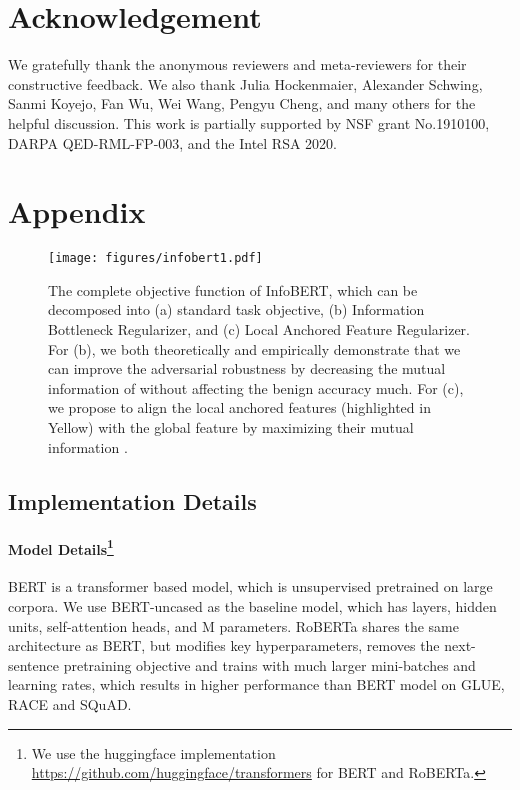 \documentclass{article} \usepackage{iclr2021_conference,times}
\theoremstyle{definition}
\theoremstyle{remark}
\newcommand{\method}{InfoBERT\xspace}
\begin{document}
\section{Acknowledgement}
We gratefully thank the anonymous reviewers and meta-reviewers for their constructive feedback. We also thank Julia Hockenmaier, Alexander Schwing, Sanmi Koyejo, Fan Wu, Wei Wang, Pengyu Cheng, and many others for the helpful discussion.   This work is partially supported by NSF grant No.1910100, DARPA QED-RML-FP-003, and the Intel RSA 2020. 



\newpage
\appendix
\section{Appendix}

\begin{figure}[htp!]
    \centering
    \texttt{[image: figures/infobert1.pdf]}
    \caption{The complete objective function of \method, which can be decomposed into (a) standard task objective, (b) Information Bottleneck Regularizer, and (c) Local Anchored Feature Regularizer. For (b), we both theoretically and empirically demonstrate that we can improve the adversarial robustness by decreasing the mutual information of  without affecting the benign accuracy much. For (c), we propose to align the local anchored features  (highlighted in Yellow) with the global feature  by maximizing their mutual information . }
    \label{fig:overall}
\end{figure}

\subsection{Implementation Details} \label{ap:setup}


\paragraph[Model Details]{Model Details\footnote{We use the huggingface implementation  \url{https://github.com/huggingface/transformers} for BERT and RoBERTa.}}  BERT is a transformer \citep{DBLP:conf/nips/VaswaniSPUJGKP17} based model, which is unsupervised pretrained on large corpora. We use BERT-uncased as the baseline model, which has  layers,   hidden units,  self-attention heads, and M parameters. RoBERTa shares the same architecture as BERT, but modifies key hyperparameters, removes the next-sentence pretraining objective and trains with much larger mini-batches and learning rates, which results in higher performance than BERT model on GLUE, RACE and SQuAD.
\end{document}
